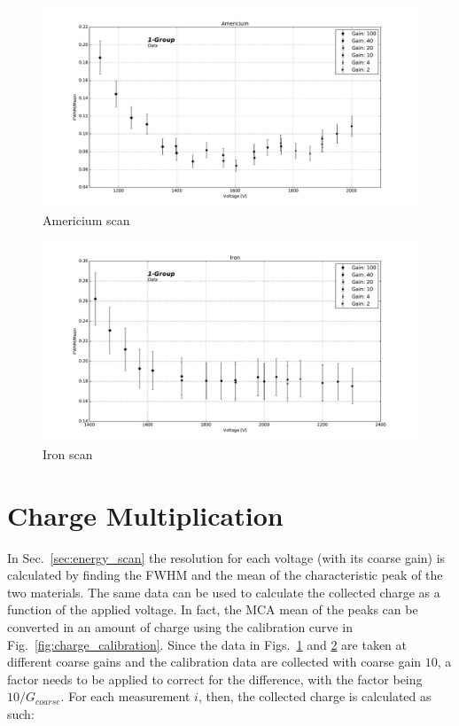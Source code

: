 \begin{figure}[htb]
  \includegraphics[width=\linewidth]{graphics/americium_scan}
  \caption{Americium scan}
  \label{fig:resolution:americium}
\end{figure}

\begin{figure}[htb]
  \includegraphics[width=\linewidth]{graphics/iron_scan}
  \caption{Iron scan}
  \label{fig:resolution:iron}
\end{figure}



\section{Charge Multiplication}
\label{sec:systematics}

In Sec.~\ref{sec:energy_scan} the resolution for each voltage (with its coarse gain) is calculated by finding the FWHM and the mean of the characteristic peak of the two materials.
The same data can be used to calculate the collected charge as a function of the applied voltage. In fact, the MCA mean of the peaks can be converted in an amount of charge using the calibration curve in Fig.~\ref{fig:charge_calibration}. Since the data in Figs.~\ref{fig:resolution:americium} and \ref{fig:resolution:iron} are taken at different coarse gains and the calibration data are collected with coarse gain $10$, a factor needs to be applied to correct for the difference, with the factor being $10/G_{coarse}$. For each measurement $i$, then, the collected charge is calculated as such:

